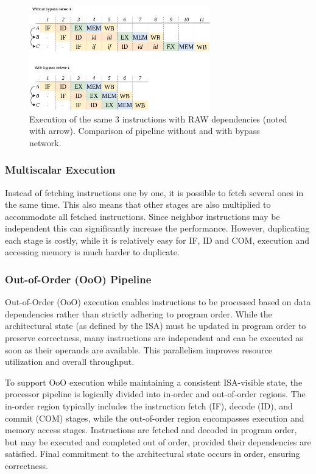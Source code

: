 \begin{figure}[H]
    \centering
    \includegraphics[width=0.7\textwidth]{figures/bypass network.png}
    \caption{Execution of the same 3 instructions with RAW dependencies (noted with arrow). Comparison of pipeline without and with bypass network.}
    \label{fig:bypass-network}
\end{figure}

\subsubsection{Multiscalar Execution}

Instead of fetching instructions one by one, it is possible to fetch several ones in the same time. This also means that other stages are also multiplied to accommodate all fetched instructions. Since neighbor instructions may be independent this can significantly increase the performance. However, duplicating each stage is costly, while it is relatively easy for IF, ID and COM, execution and accessing memory is much harder to duplicate.


\subsubsection{Out-of-Order (OoO) Pipeline}
Out-of-Order (OoO) execution enables instructions to be processed based on data dependencies rather than strictly adhering to program order. While the architectural state (as defined by the ISA) must be updated in program order to preserve correctness, many instructions are independent and can be executed as soon as their operands are available. This parallelism improves resource utilization and overall throughput.

To support OoO execution while maintaining a consistent ISA-visible state, the processor pipeline is logically divided into in-order and out-of-order regions. The in-order region typically includes the instruction fetch (IF), decode (ID), and commit (COM) stages, while the out-of-order region encompasses execution and memory access stages. Instructions are fetched and decoded in program order, but may be executed and completed out of order, provided their dependencies are satisfied. Final commitment to the architectural state occurs in order, ensuring correctness.

